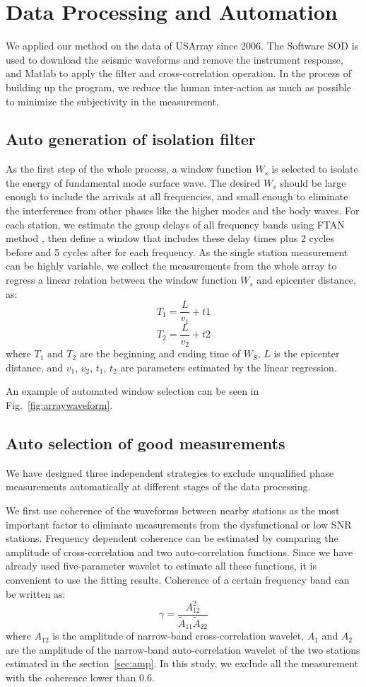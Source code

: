 \documentclass[referee]{gji}
\begin{document}
\section{Data Processing and Automation}
\label{sec:data_processing}
We applied our method on the data of USArray since 2006. The Software SOD \cite{Owens:2004sod} is used to download the seismic waveforms and remove the instrument response, and Matlab to apply the filter and cross-correlation operation.
In the process of building up the program, we reduce the human inter-action as much as possible to minimize the subjectivity in the measurement.

\subsection{Auto generation of isolation filter}
As the first step of the whole process, a window function $W_s$ is selected to isolate the energy of fundamental mode surface wave. The desired $W_s$ should be large enough to include the arrivals at all frequencies, and small enough to eliminate the interference from other phases like the higher modes and the body waves. For each station, we estimate the group delays of all frequency bands using FTAN method \cite{Levshin:1992ve}, then define a window that includes these delay times plus 2 cycles before and 5 cycles after for each frequency. As the single station measurement can be highly variable, we collect the measurements from the whole array to regress a linear relation between the window function $W_s$ and epicenter distance, as:
\[
T_1 = \frac{L}{v_1} + t1
\]
\[
T_2 = \frac{L}{v_2} + t2
\]
where $T_1$ and $T_2$ are the beginning and ending time of $W_S$, $L$ is the epicenter distance, and $v_1$, $v_2$, $t_1$, $t_2$ are parameters estimated by the linear regression.

An example of automated window selection can be seen in Fig.~\ref{fig:arraywaveform}.

\subsection{Auto selection of good measurements}

We have designed three independent strategies to exclude unqualified phase measurements automatically at different stages of the data processing.

We first use coherence of the waveforms between nearby stations as the most important factor to eliminate measurements from the dysfunctional or low SNR stations. Frequency dependent coherence can be estimated by comparing the amplitude of cross-correlation and two auto-correlation functions. Since we have already used five-parameter wavelet to estimate all these functions, it is convenient to use the fitting results. Coherence of a certain frequency band can be written as:
\[
\gamma = \frac{A_{12}^2}{\tilde{A}_{11}\tilde{A}_{22}}
\]
where $A_{12}$ is the amplitude of narrow-band cross-correlation wavelet, $A_{1}$  and $A_{2}$ are the amplitude of the narrow-band auto-correlation wavelet of the two stations estimated in the section~\ref{sec:amp}. In this study, we exclude all the measurement with the coherence lower than 0.6.
\end{document}
